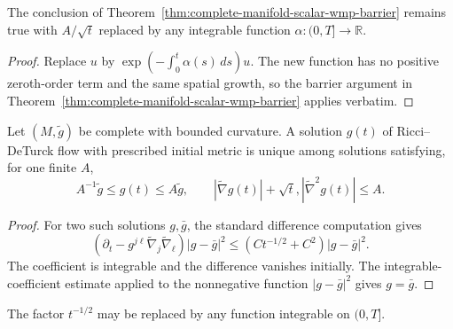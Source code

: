 \begin{example}
\label{ex:wmp-integrable-time-coefficient}
The conclusion of Theorem~\ref{thm:complete-manifold-scalar-wmp-barrier}
remains true with $A/\sqrt t$ replaced by any integrable function
$\alpha:(0,T]\to\mathbb R$.
\end{example}

\begin{proof}
\sketch
{}
Replace $u$ by
$\exp(-\int_0^t\alpha(s)\,ds)u$.  The new function has no positive
zeroth-order term and the same spatial growth, so the barrier argument in
Theorem~\ref{thm:complete-manifold-scalar-wmp-barrier} applies verbatim.
\end{proof}

\begin{proposition}
\label{prop:ricci-deturck-uniqueness-controlled-class}
Let $(M,\widetilde g)$ be complete with bounded curvature.  A solution $g(t)$
of Ricci--DeTurck flow with prescribed initial metric is unique among solutions
satisfying, for one finite $A$,
\[
A^{-1}\widetilde g\leq g(t)\leq A\widetilde g,
\qquad
|\widetilde\nabla g(t)|+\sqrt t,|\widetilde\nabla^2g(t)|\leq A.
\]
\end{proposition}

\begin{proof}
\sketch
{}
For two such solutions $g,\bar g$, the standard difference computation gives
\[
(\partial_t-g^{j\ell}\widetilde\nabla_j\widetilde\nabla_\ell)
|g-\bar g|^2\leq(Ct^{-1/2}+C^2)|g-\bar g|^2.
\]
The coefficient is integrable and the difference vanishes initially.
The integrable-coefficient estimate applied to the nonnegative
function $|g-\bar g|^2$ gives $g=\bar g$.
\end{proof}

\begin{remark}
\label{rem:wmp-integrable-time-singularity}
The factor $t^{-1/2}$ may be replaced by any function integrable on $(0,T]$.
\end{remark}

